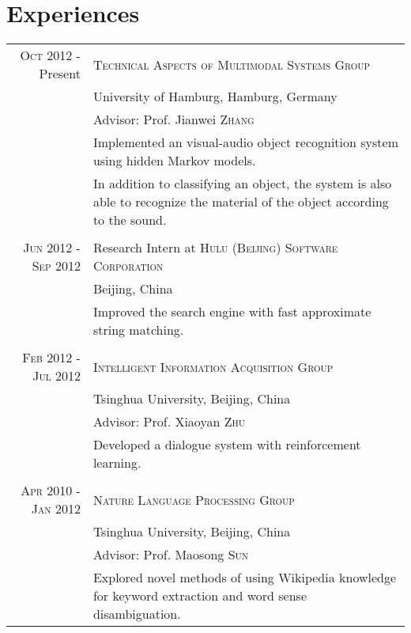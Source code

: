 \documentclass[a4paper,11pt]{article} %
\begin{document}

\section{Experiences}
\begin{tabular}{r|p{11cm}}	
  \textsc{Oct 2012} - Present & \textsc{Technical Aspects of Multimodal Systems Group} \\
  & University of Hamburg, Hamburg, Germany \\
  & Advisor: Prof. Jianwei \textsc{Zhang} \\
  & {\footnotesize Implemented an visual-audio object recognition system using hidden Markov models.} \\
  & {\footnotesize In addition to classifying an object, the system is also able to recognize the material of the object according to the sound.}\\
  \multicolumn{2}{c}{} \\


  \textsc{Jun 2012 - Sep 2012} & Research Intern at \textsc{Hulu (Beijing) Software Corporation} \\
  & Beijing, China \\
  & {\footnotesize Improved the search engine with fast approximate string matching.} \\
  \multicolumn{2}{c}{} \\


  \textsc{Feb 2012 - Jul 2012} & \textsc{Intelligent Information Acquisition Group} \\
  & Tsinghua University, Beijing, China \\
  & Advisor: Prof. Xiaoyan \textsc{Zhu} \\
  & {\footnotesize Developed a dialogue system with reinforcement learning.} \\
  \multicolumn{2}{c}{} \\


  \textsc{Apr 2010 - Jan 2012} & \textsc{Nature Language Processing Group} \\
  & Tsinghua University, Beijing, China \\
  & Advisor: Prof. Maosong \textsc{Sun} \\
  & {\footnotesize Explored novel methods of using Wikipedia knowledge for keyword extraction and word sense disambiguation.} \\

\end{tabular}
\end{document}
